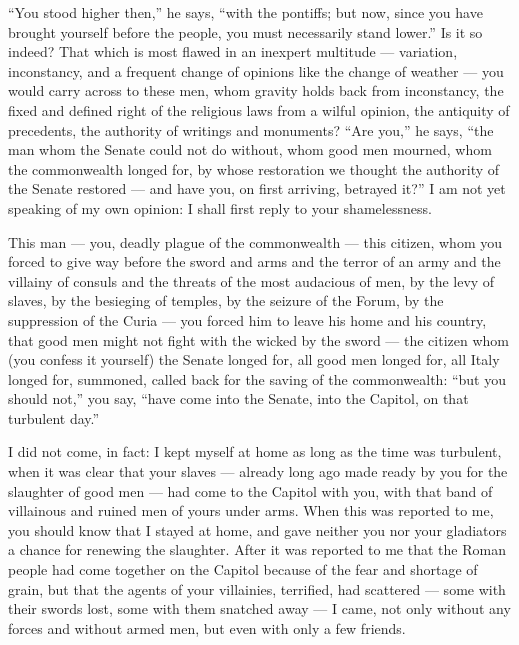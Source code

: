  ``You stood higher then,'' he says, ``with the pontiffs; but now, since you have brought yourself before the people, you must necessarily stand lower.'' Is it so indeed? That which is most flawed in an inexpert multitude --- variation, inconstancy, and a frequent change of opinions like the change of weather --- you would carry across to these men, whom gravity holds back from inconstancy, the fixed and defined right of the religious laws from a wilful opinion, the antiquity of precedents, the authority of writings and monuments? ``Are you,'' he says, ``the man whom the Senate could not do without, whom good men mourned, whom the commonwealth longed for, by whose restoration we thought the authority of the Senate restored --- and have you, on first arriving, betrayed it?'' I am not yet speaking of my own opinion: I shall first reply to your shamelessness.

 This man --- you, deadly plague of the commonwealth --- this citizen, whom you forced to give way before the sword and arms and the terror of an army and the villainy of consuls and the threats of the most audacious of men, by the levy of slaves, by the besieging of temples, by the seizure of the Forum, by the suppression of the Curia --- you forced him to leave his home and his country, that good men might not fight with the wicked by the sword --- the citizen whom (you confess it yourself) the Senate longed for, all good men longed for, all Italy longed for, summoned, called back for the saving of the commonwealth: ``but you should not,'' you say, ``have come into the Senate, into the Capitol, on that turbulent day.''

 I did not come, in fact: I kept myself at home as long as the time was turbulent, when it was clear that your slaves --- already long ago made ready by you for the slaughter of good men --- had come to the Capitol with you, with that band of villainous and ruined men of yours under arms. When this was reported to me, you should know that I stayed at home, and gave neither you nor your gladiators a chance for renewing the slaughter. After it was reported to me that the Roman people had come together on the Capitol because of the fear and shortage of grain, but that the agents of your villainies, terrified, had scattered --- some with their swords lost, some with them snatched away --- I came, not only without any forces and without armed men, but even with only a few friends.

